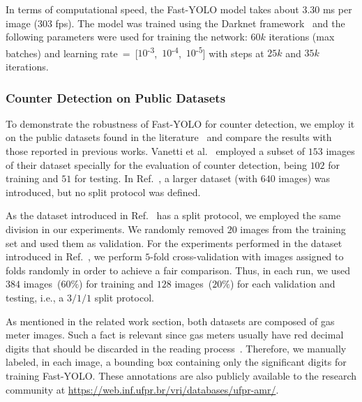 In terms of computational speed, the Fast-YOLO model takes about $3.30$ ms per image ($303$ \gls*{fps}). The model was trained using the Darknet framework~\cite{darknet13} and the following parameters were used for training the network: $60k$ iterations (max batches) and learning rate~=~[$10$\textsuperscript{-$3$},~$10$\textsuperscript{-$4$},~$10$\textsuperscript{-$5$}] with steps at $25k$ and $35k$ iterations.

\subsubsection{Counter Detection on Public Datasets}

To demonstrate the robustness of Fast-YOLO for counter detection, we employ it on the public datasets found in the literature~\cite{vanetti2013gas,goncalves2016reconhecimento} and compare the results with those reported in previous works.
Vanetti et al.~\cite{vanetti2013gas} employed a subset of $153$ images of their dataset specially for the evaluation of counter detection, being $102$ for training and $51$ for testing. In Ref.~, a larger dataset (with $640$ images) was introduced, but no split protocol was defined.

As the dataset introduced in Ref.~ has a split protocol, we employed the same division in our experiments. We randomly removed $20$ images from the training set and used them as validation. For the experiments performed in the dataset introduced in Ref.~, we perform $5$-fold cross-validation with images assigned to folds randomly in order to achieve a fair comparison. Thus, in each run, we used $384$ images~($60\%$) for training and $128$ images~($20\%$) for each validation and testing, i.e., a $3/1/1$ split protocol. 

As mentioned in the related work section, both datasets are composed of gas meter images.
Such a fact is relevant since gas meters usually have red decimal digits that should be discarded in the reading process~\cite{vanetti2013gas,gallo2015robust,goncalves2016reconhecimento,gomez2018cutting}. Therefore, we manually labeled, in each image, a bounding box containing only the significant digits for training Fast-YOLO. These annotations are also publicly available to the research community at \small \url{https://web.inf.ufpr.br/vri/databases/ufpr-amr/}\normalsize.

